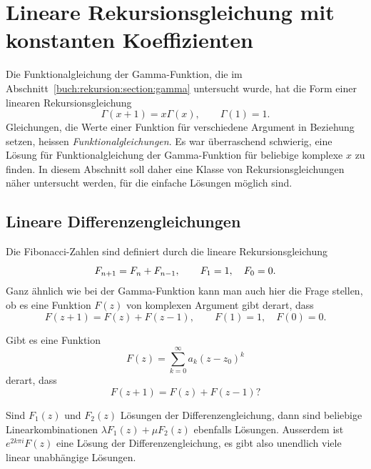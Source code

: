 %
%
%
\section{Lineare Rekursionsgleichung mit konstanten Koeffizienten
\label{buch:rekursion:section:linear}}
Die Funktionalgleichung der Gamma-Funktion, die im
Abschnitt~\ref{buch:rekursion:section:gamma} untersucht wurde,
hat die Form einer linearen Rekursionsgleichung
\[
\Gamma(x+1) = x\Gamma(x),\qquad \Gamma(1) = 1.
\]
Gleichungen, die Werte einer Funktion für verschiedene
Argument in Beziehung setzen, heissen {\em Funktionalgleichungen}.
%
Es war überraschend schwierig, eine Lösung für Funktionalgleichung
der Gamma-Funktion für beliebige komplexe $x$ zu finden.
In diesem Abschnitt soll daher eine Klasse von Rekursionsgleichungen
näher untersucht werden, für die einfache Lösungen möglich sind.

\subsection{Lineare Differenzengleichungen}
Die Fibonacci-Zahlen sind definiert durch die lineare Rekursionsgleichung
\begin{equation}
F_{n+1\mathstrut} = F_{n\mathstrut} + F_{n-1\mathstrut},
\qquad
F_1=1,\quad F_0=0.
\label{buch:rekursion:eqn:fibonacci}
\end{equation}
Ganz ähnlich wie bei der Gamma-Funktion kann man auch hier die Frage
stellen, ob es eine Funktion $F(z)$ von komplexen Argument gibt derart,
dass
\begin{equation}
F(z+1) = F(z) + F(z-1), \qquad F(1)=1,\quad F(0)=0.
\label{buch:rekursion:eqn:fibonaccikomplex}
\end{equation}

\begin{aufgabe}
Gibt es eine Funktion
\[
F(z) = \sum_{k=0}^\infty a_k (z-z_0)^k
\]
derart, dass
\[
F(z+1) = F(z)+F(z-1)?
\]
\end{aufgabe}

Sind $F_1(z)$ und $F_2(z)$ Lösungen der Differenzengleichung, dann
sind beliebige Linearkombinationen $\lambda F_1(z) + \mu F_2(z)$
ebenfalls Lösungen.
Ausserdem ist $e^{2k\pi i}F(z)$ eine Lösung der Differenzengleichung,
es gibt also unendlich viele linear unabhängige Lösungen.

